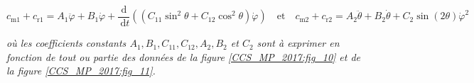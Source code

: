 \vspace{-.5cm}
$$ c_{\mathrm{m} 1}+c_{\mathrm{r} 1}=A_{1} \ddot{\varphi}+B_{1} \dot{\varphi}+\frac{\mathrm{d}}{\mathrm{~d} t}\left(\left(C_{11} \sin ^{2} \theta+C_{12} \cos ^{2} \theta\right) \dot{\varphi}\right) 
\quad \text{et} \quad
c_{\mathrm{m} 2}+c_{\mathrm{r} 2}=A_{2} \ddot{\theta}+B_{2} \dot{\theta}+C_{2} \sin (2 \theta) \dot{\varphi}^{2}$$


\textit{où les coefficients constants $A_{1}, B_{1}, C_{11}, C_{12}, A_{2}, B_{2}$ et $C_{2}$ sont à exprimer en fonction de tout ou partie des données de la figure \ref{CCS_MP_2017:fig_10} et de la figure \ref{CCS_MP_2017:fig_11}.}

